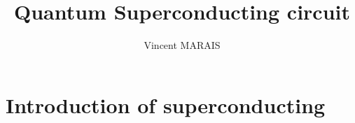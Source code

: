 \documentclass[12pt,a4paper]{article}
\title{Quantum Superconducting circuit}
\author{\textup{Vincent MARAIS}}
\begin{document}
	
	
	\tableofcontents


\newpage
\section{Introduction of superconducting}

\newpage




\end{document}
